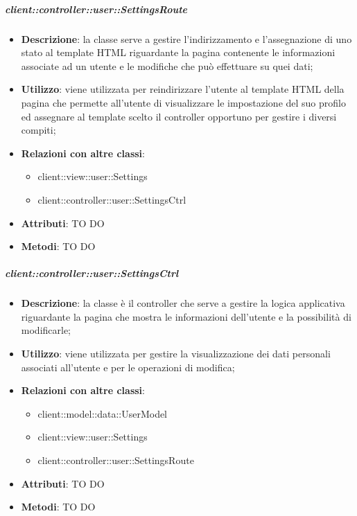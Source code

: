		\subparagraph{client::controller::user::SettingsRoute} %
		\label{subp:bdsm_app_client_controller_user_settingsroute}
			\begin{itemize}
				\item \textbf{Descrizione}: la classe serve a gestire l'indirizzamento e l'assegnazione di uno stato al template HTML riguardante la pagina contenente le informazioni associate ad un utente e le modifiche che può effettuare su quei dati;
				\item \textbf{Utilizzo}: viene utilizzata per reindirizzare l'utente al template HTML della pagina che permette all'utente di visualizzare le impostazione del suo profilo ed assegnare al template scelto il controller opportuno per gestire i diversi compiti;
				\item \textbf{Relazioni con altre classi}:
					\begin{itemize}
						\item client::view::user::Settings
						\item client::controller::user::SettingsCtrl
					\end{itemize}
				\item \textbf{Attributi}: TO DO
				\item \textbf{Metodi}: TO DO
			\end{itemize}

		\subparagraph{client::controller::user::SettingsCtrl} %
		\label{subp:client_controller_user_settingsctrl}
			\begin{itemize}
				\item \textbf{Descrizione}: la classe è il controller che serve a gestire la logica applicativa riguardante la pagina che mostra le informazioni dell'utente e la possibilità di modificarle;
				\item \textbf{Utilizzo}: viene utilizzata per gestire la visualizzazione dei dati personali associati all'utente e per le operazioni di modifica;
				\item \textbf{Relazioni con altre classi}:
					\begin{itemize}
						\item client::model::data::UserModel
						\item client::view::user::Settings
						\item client::controller::user::SettingsRoute
					\end{itemize}
				\item \textbf{Attributi}: TO DO
				\item \textbf{Metodi}: TO DO
			\end{itemize}

